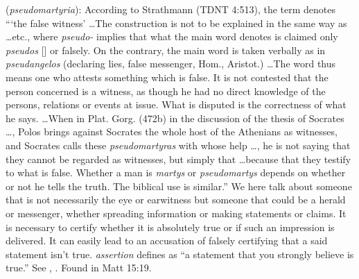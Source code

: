 \item[False assertion,]

(\textit{pseudomartyria}):
According to Strathmann (TDNT 4:513), the term denotes ```the false witness' \ldots The construction is not to be explained in the same way as \ldots etc., where \emph{pseudo-} implies that what the main word denotes is claimed only \emph{pseudos} [] or falsely.  On the contrary, the main word is taken verbally as in \emph{pseudangelos} (declaring lies, false messenger, Hom., Aristot.) \ldots The word thus means one who attests something which is false. It is not contested that the person concerned is a witness, as though he had no direct knowledge of the persons, relations or events at issue. What is disputed is the correctness of what he says. \ldots When in Plat. Gorg. (472b) in the discussion of the thesis of Socrates \ldots, Polos brings against Socrates the whole host of the Athenians as witnesses, and Socrates calls these \emph{pseudomartyras} with whose help \ldots, he is not saying that they cannot be regarded as witnesses, but simply that \ldots because that they testify to what is false. Whether a man is \emph{martys} or \emph{pseudomartys} depends on whether or not he tells the truth. The biblical use is similar.'' We here talk about someone that is not necessarily the eye or earwitness but someone that could be a herald or messenger, whether spreading information or making statements or claims. It is necessary to certify whether it is absolutely true or if such an impression is delivered. It can easily lead to an accusation of falsely certifying that a said statement isn't true. \emph{assertion} defines as ``a statement that you strongly believe is true.'' See , .
Found in Matt 15:19.
